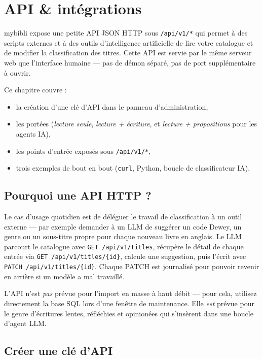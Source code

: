 \chapter{API \& intégrations}
\label{ch:api}

mybibli expose une petite API JSON HTTP sous \texttt{/api/v1/*} qui
permet à des scripts externes et à des outils d'intelligence
artificielle de lire votre catalogue et de modifier la classification
des titres. Cette API est servie par le même serveur web que
l'interface humaine — pas de démon séparé, pas de port supplémentaire
à ouvrir.

Ce chapitre couvre :

\begin{itemize}
  \item la création d'une clé d'API dans le panneau d'administration,
  \item les portées (\emph{lecture seule}, \emph{lecture +
        écriture}, et \emph{lecture + propositions} pour les agents
        IA),
  \item les points d'entrée exposés sous \texttt{/api/v1/*},
  \item trois exemples de bout en bout (\texttt{curl}, Python, boucle
        de classificateur IA).
\end{itemize}

\section{Pourquoi une API HTTP ?}

Le cas d'usage quotidien est de déléguer le travail de classification
à un outil externe — par exemple demander à un LLM de suggérer un
code Dewey, un genre ou un sous-titre propre pour chaque nouveau
livre en anglais. Le LLM parcourt le catalogue avec
\texttt{GET /api/v1/titles}, récupère le détail de chaque entrée via
\texttt{GET /api/v1/titles/\{id\}}, calcule une suggestion, puis
l'écrit avec \texttt{PATCH /api/v1/titles/\{id\}}. Chaque PATCH est
journalisé pour pouvoir revenir en arrière si un modèle a mal
travaillé.

L'API n'est \emph{pas} prévue pour l'import en masse à haut débit —
pour cela, utilisez directement la base SQL lors d'une fenêtre de
maintenance. Elle \emph{est} prévue pour le genre d'écritures lentes,
réfléchies et opinionées qui s'insèrent dans une boucle d'agent LLM.

\section{Créer une clé d'API}
\label{sec:api-keys-create}

